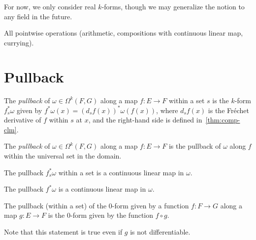For now, we only consider real \(k\)-forms, though we may generalize the notion to any field in the future.

All pointwise operations (arithmetic, compositions with continuous linear map, currying).

\section{Pullback}%
\label{sec:pullback}

\begin{definition}
  The \emph{pullback} of \(\omega\in \Omega^{k}(F, G)\) along a map \(f\colon E\to F\) within a set \(s\)
  is the \(k\)-form \(f_{s}^{*}\omega\) given by \(f^{*}\omega(x) = {(d_{s}f(x))}^{*}\omega(f(x))\),
  where \(d_{s}f(x)\) is the Fréchet derivative of \(f\) within \(s\) at \(x\),
  and the right-hand side is defined in~\autoref{thm:comp-clm}.
\end{definition}

\begin{definition}
  The \emph{pullback} of \(\omega\in \Omega^{k}(F, G)\) along a map \(f\colon E\to F\)
  is the pullback of \(\omega\) along \(f\) within the universal set in the domain.
\end{definition}

\begin{theorem}
  The pullback \(f_{s}^{*}\omega\) within a set is a continuous linear map in \(\omega\).
\end{theorem}

\begin{theorem}
  The pullback \(f^{*}\omega\) is a continuous linear map in \(\omega\).
\end{theorem}

\begin{theorem}
  The pullback (within a set) of the \(0\)-form given by a function \(f\colon F\to G\) along a map \(g\colon E\to F\)
  is the \(0\)-form given by the function \(f\circ g\).

  Note that this statement is true even if \(g\) is not differentiable.
\end{theorem}


